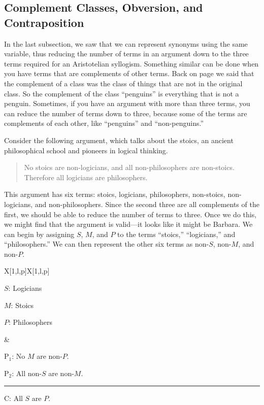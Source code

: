 
\subsection{Complement Classes, Obversion, and Contraposition}

In the last subsection, we saw that we can represent synonyms using the same variable, thus reducing the number of terms in an argument down to the three terms required for an Aristotelian syllogism. Something similar can be done when you have terms that are complements of other terms. Back on page \pageref{def:Complement} we said that the complement of a class was the class of things that are not in the original class. So the complement of the class ``penguins'' is everything that is not a penguin. Sometimes, if you have an argument with more than three terms, you can reduce the number of terms down to three, because some of the terms are complements of each other, like ``penguins'' and ``non-penguins.''

 Consider the following argument, which talks about the stoics, an ancient philosophical school and pioneers in logical thinking. 

\begin{quotation}
No stoics are non-logicians, and all non-philosophers are non-stoics. Therefore all logicians are philosophers.
\end{quotation}

This argument has six terms: stoics, logicians, philosophers, non-stoics, non-logicians, and non-philosophers. Since the second three are all complements of the first, we should be able to reduce the number of terms to three. Once we do this, we might find that the argument is valid---it looks like it might be Barbara. We can begin by assigning $S$, $M$, and $P$ to the terms ``stoics,'' ``logicians,'' and ``philosophers.'' We can then represent the other six terms as non-$S$, non-$M$, and non-$P$. 


\begin{tabu}{{X[1,l,p]X[1,l,p]}}

\begin{ekey}
\item[$S$:] Logicians
\item[$M$:] Stoics
\item[$P$:] Philosophers
\end{ekey}

&

\begin{earg}
\item[P$_1$:]  No $M$ are non-$P$.
\item[P$_2$:] All non-$S$ are non-$M$.
\vspace{-.5em}
\item [] \rule{0.6\linewidth}{.5pt} 
\item[C:] All $S$ are $P$.
\end{earg} 

\end{tabu}


